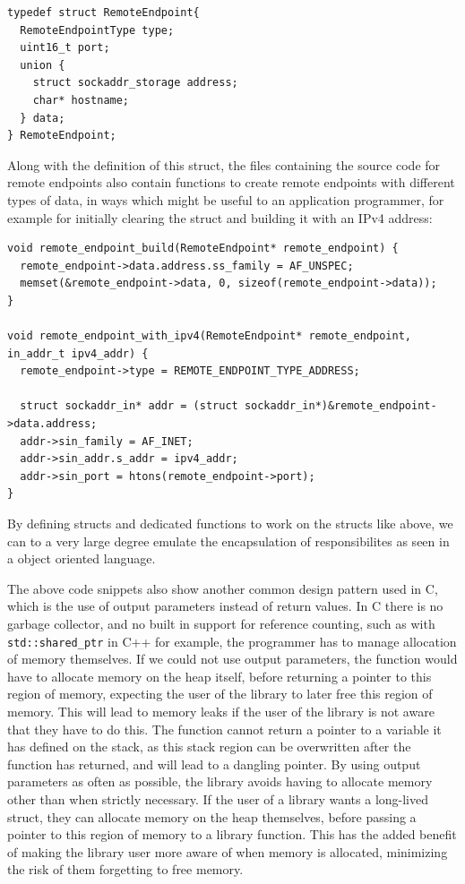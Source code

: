 \begin{verbatim}
typedef struct RemoteEndpoint{
  RemoteEndpointType type;
  uint16_t port;
  union {
    struct sockaddr_storage address;
    char* hostname;
  } data;
} RemoteEndpoint;
\end{verbatim}

Along with the definition of this struct, the files containing the
source code for remote endpoints also contain functions to create 
remote endpoints with different types of data, in ways which might be useful
to an application programmer, for example for initially clearing the struct
and building it with an IPv4 address:

\begin{verbatim}
void remote_endpoint_build(RemoteEndpoint* remote_endpoint) {
  remote_endpoint->data.address.ss_family = AF_UNSPEC;
  memset(&remote_endpoint->data, 0, sizeof(remote_endpoint->data));
}

void remote_endpoint_with_ipv4(RemoteEndpoint* remote_endpoint, in_addr_t ipv4_addr) {
  remote_endpoint->type = REMOTE_ENDPOINT_TYPE_ADDRESS;

  struct sockaddr_in* addr = (struct sockaddr_in*)&remote_endpoint->data.address;
  addr->sin_family = AF_INET;
  addr->sin_addr.s_addr = ipv4_addr;
  addr->sin_port = htons(remote_endpoint->port);
}
\end{verbatim} 

By defining structs and dedicated functions to work on the structs like
above, we can to a very large degree emulate the encapsulation of responsibilites
as seen in a object oriented language.

The above code snippets also show another common design pattern used in C, which
is the use of output parameters instead of return values. In C there is no garbage
collector, and no built in support for reference counting, such as with \texttt{std::shared\_ptr}
in C++ for example, the programmer has to manage allocation of memory themselves.
If we could not use output parameters, the function would have to allocate memory on
the heap itself, before returning a pointer to this region of memory, expecting the
user of the library to later free this region of memory. 
This will lead to memory leaks
if the user of the library is not aware that they have to do this. 
The function cannot
return a pointer to a variable it has defined on the stack, as this stack
region can be overwritten after the function has returned, and will lead to a dangling
pointer.
By using output parameters as often as possible, the library avoids having to
allocate memory other than when strictly necessary. If the user of a library
wants a long-lived struct, they can allocate memory on the heap themselves, before
passing a pointer to this region of memory to a library function. This has
the added benefit of making the library user more aware of when memory is allocated,
minimizing the risk of them forgetting to free memory.

